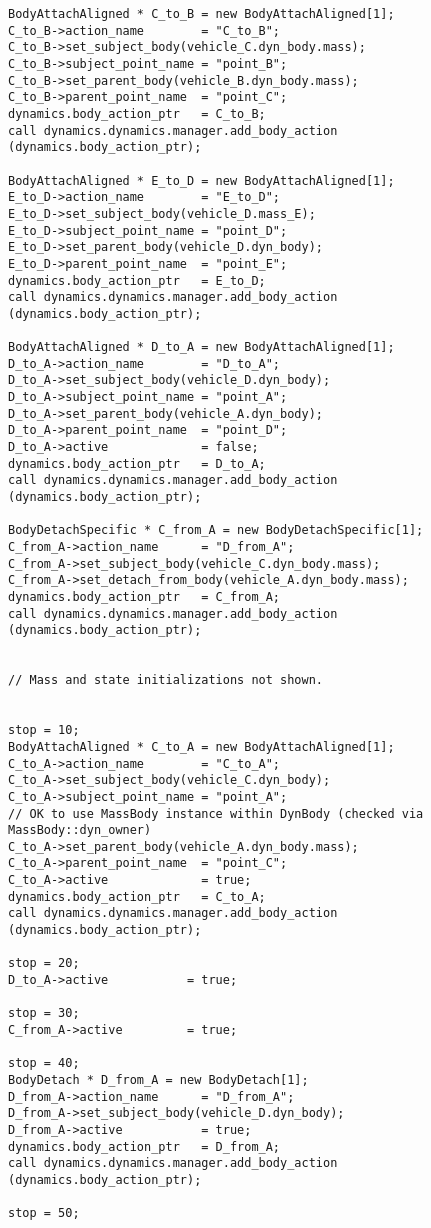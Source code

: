 \begin{verbatim}
BodyAttachAligned * C_to_B = new BodyAttachAligned[1];
C_to_B->action_name        = "C_to_B";
C_to_B->set_subject_body(vehicle_C.dyn_body.mass);
C_to_B->subject_point_name = "point_B";
C_to_B->set_parent_body(vehicle_B.dyn_body.mass);
C_to_B->parent_point_name  = "point_C";
dynamics.body_action_ptr   = C_to_B;
call dynamics.dynamics.manager.add_body_action (dynamics.body_action_ptr);

BodyAttachAligned * E_to_D = new BodyAttachAligned[1];
E_to_D->action_name        = "E_to_D";
E_to_D->set_subject_body(vehicle_D.mass_E);
E_to_D->subject_point_name = "point_D";
E_to_D->set_parent_body(vehicle_D.dyn_body);
E_to_D->parent_point_name  = "point_E";
dynamics.body_action_ptr   = E_to_D;
call dynamics.dynamics.manager.add_body_action (dynamics.body_action_ptr);

BodyAttachAligned * D_to_A = new BodyAttachAligned[1];
D_to_A->action_name        = "D_to_A";
D_to_A->set_subject_body(vehicle_D.dyn_body);
D_to_A->subject_point_name = "point_A";
D_to_A->set_parent_body(vehicle_A.dyn_body);
D_to_A->parent_point_name  = "point_D";
D_to_A->active             = false;
dynamics.body_action_ptr   = D_to_A;
call dynamics.dynamics.manager.add_body_action (dynamics.body_action_ptr);

BodyDetachSpecific * C_from_A = new BodyDetachSpecific[1];
C_from_A->action_name      = "D_from_A";
C_from_A->set_subject_body(vehicle_C.dyn_body.mass);
C_from_A->set_detach_from_body(vehicle_A.dyn_body.mass);
dynamics.body_action_ptr   = C_from_A;
call dynamics.dynamics.manager.add_body_action (dynamics.body_action_ptr);


// Mass and state initializations not shown.


stop = 10;
BodyAttachAligned * C_to_A = new BodyAttachAligned[1];
C_to_A->action_name        = "C_to_A";
C_to_A->set_subject_body(vehicle_C.dyn_body);
C_to_A->subject_point_name = "point_A";
// OK to use MassBody instance within DynBody (checked via MassBody::dyn_owner)
C_to_A->set_parent_body(vehicle_A.dyn_body.mass);
C_to_A->parent_point_name  = "point_C";
C_to_A->active             = true;
dynamics.body_action_ptr   = C_to_A;
call dynamics.dynamics.manager.add_body_action (dynamics.body_action_ptr);

stop = 20;
D_to_A->active           = true;

stop = 30;
C_from_A->active         = true;

stop = 40;
BodyDetach * D_from_A = new BodyDetach[1];
D_from_A->action_name      = "D_from_A";
D_from_A->set_subject_body(vehicle_D.dyn_body);
D_from_A->active           = true;
dynamics.body_action_ptr   = D_from_A;
call dynamics.dynamics.manager.add_body_action (dynamics.body_action_ptr);

stop = 50;
\end{verbatim}

